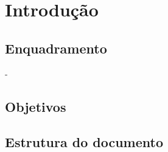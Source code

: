 \chapter{Introdução}
\label{chapter:introduction}

\section{Enquadramento}


-
\section{Objetivos}


\section{Estrutura do documento}


